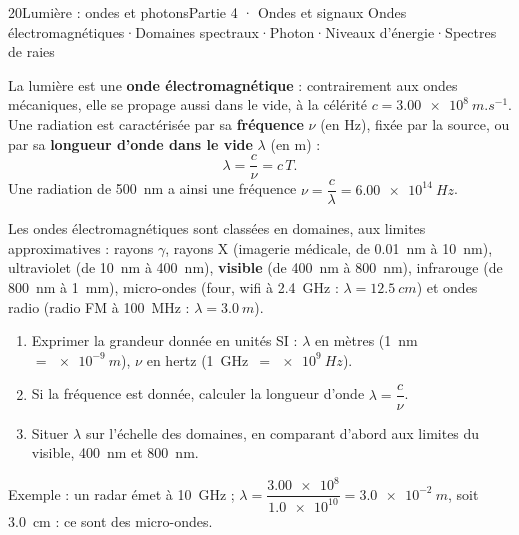 \begin{ouverture}[photons]{20}{Lumière : ondes et photons}{Partie 4 · Ondes et signaux}
{Ondes électromagnétiques\enspace·\enspace Domaines spectraux\enspace·\enspace Photon\enspace·\enspace Niveaux d'énergie\enspace·\enspace Spectres de raies}
\end{ouverture}
\essentiel
{}
\begin{definition}
La lumière est une \textbf{onde électromagnétique} : contrairement aux ondes mécaniques, elle se propage aussi dans le vide, à la célérité
$c=\qty{3,00e8}{m.s^{-1}}$. Une radiation est caractérisée par sa \textbf{fréquence} $\nu$ (en Hz), fixée par la source, ou par sa \textbf{longueur
d'onde dans le vide} $\lambda$ (en m) :
\[\lambda=\frac{c}{\nu}=c\,T.\]
Une radiation de \qty{500}{nm} a ainsi une fréquence $\nu=\dfrac{c}{\lambda}=\qty{6,00e14}{Hz}$.
\end{definition}
\par{}
\begin{propriete}
Les ondes électromagnétiques sont classées en domaines, aux limites approximatives : rayons $\gamma$, rayons X (imagerie médicale, de
\qty{0,01}{nm} à \qty{10}{nm}), ultraviolet (de \qty{10}{nm} à \qty{400}{nm}), \textbf{visible} (de \qty{400}{nm} à \qty{800}{nm}), infrarouge (de \qty{800}{nm} à \qty{1}{mm}),
micro-ondes (four, wifi à \qty{2,4}{GHz} : $\lambda=\qty{12,5}{cm}$) et ondes radio (radio FM à \qty{100}{MHz} : $\lambda=\qty{3,0}{m}$).
\end{propriete}
\begin{savoirfaire}
\begin{enumerate}
\item Exprimer la grandeur donnée en unités SI : $\lambda$ en mètres (\qty{1}{nm}~$=\qty{e-9}{m}$), $\nu$ en hertz (\qty{1}{GHz}~$=\qty{e9}{Hz}$).
\item Si la fréquence est donnée, calculer la longueur d'onde $\lambda=\dfrac{c}{\nu}$.
\item Situer $\lambda$ sur l'échelle des domaines, en comparant d'abord aux limites du visible, \qty{400}{nm} et \qty{800}{nm}.
\end{enumerate}
Exemple : un radar émet à \qty{10}{GHz} ; $\lambda=\dfrac{\num{3,00e8}}{\num{1,0e10}}=\qty{3,0e-2}{m}$, soit \qty{3,0}{cm} : ce sont des micro-ondes.
\end{savoirfaire}
